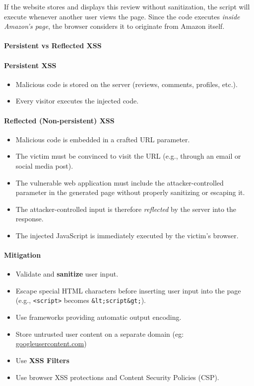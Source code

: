 If the website stores and displays this review without sanitization, the script will execute whenever another user views the page.
Since the code executes \emph{inside Amazon's page}, the browser considers it to originate from Amazon itself.

\paragraph{Persistent vs Reflected XSS}

\paragraph{Persistent XSS}

\begin{itemize}
    \item Malicious code is stored on the server (reviews, comments, profiles, etc.).
    \item Every visitor executes the injected code.
\end{itemize}

\vspace{0.3em}
\paragraph{Reflected (Non-persistent) XSS}

\begin{itemize}
    \item Malicious code is embedded in a crafted URL parameter.
    \item The victim must be convinced to visit the URL (e.g., through an email or social media post).
    \item The vulnerable web application must include the attacker-controlled parameter in the generated page without properly sanitizing or escaping it.    
    \item The attacker-controlled input is therefore \emph{reflected} by the server into the response.
    \item The injected JavaScript is immediately executed by the victim's browser.
\end{itemize}

\paragraph{Mitigation}

\begin{itemize}
    \item Validate and \textbf{sanitize} user input.
    \item Escape special HTML characters before inserting user input into the page (e.g., \texttt{<script>} becomes \texttt{\&lt;script\&gt;}).
    \item Use frameworks providing automatic output encoding.
    \item Store untrusted user content on a separate domain (eg: \url{googleusercontent.com})
    \item Use \textbf{XSS Filters}
    \item Use browser XSS protections and Content Security Policies (CSP).
\end{itemize}
